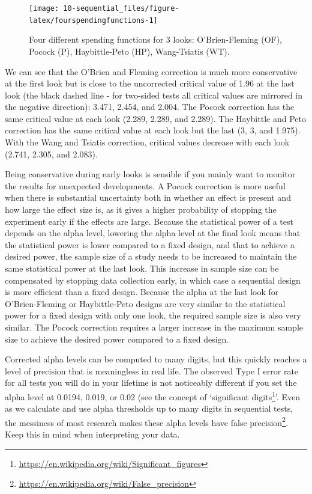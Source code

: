 \documentclass[
  oneside]{krantz}
\renewcommand{\href}[2]{#2\footnote{\url{#1}}}
\begin{document}
\begin{figure}

{\centering \texttt{[image: 10-sequential\_files/figure-latex/fourspendingfunctions-1]} 

}

\caption{Four different spending functions for 3 looks: O'Brien-Fleming (OF), Pocock (P), Haybittle-Peto (HP), Wang-Tsiatis (WT).}\label{fig:fourspendingfunctions}
\end{figure}

We can see that the O'Brien and Fleming correction is much more conservative at the first look but is close to the uncorrected critical value of 1.96 at the last look (the black dashed line - for two-sided tests all critical values are mirrored in the negative direction): 3.471, 2.454, and 2.004. The Pocock correction has the same critical value at each look (2.289, 2.289, and 2.289). The Haybittle and Peto correction has the same critical value at each look but the last (3, 3, and 1.975). With the Wang and Tsiatis correction, critical values decrease with each look (2.741, 2.305, and 2.083).

Being conservative during early looks is sensible if you mainly want to monitor the results for unexpected developments. A Pocock correction is more useful when there is substantial uncertainty both in whether an effect is present and how large the effect size is, as it gives a higher probability of stopping the experiment early if the effects are large. Because the statistical power of a test depends on the alpha level, lowering the alpha level at the final look means that the statistical power is lower compared to a fixed design, and that to achieve a desired power, the sample size of a study needs to be increased to maintain the same statistical power at the last look. This increase in sample size can be compensated by stopping data collection early, in which case a sequential design is more efficient than a fixed design. Because the alpha at the last look for O'Brien-Fleming or Haybittle-Peto designs are very similar to the statistical power for a fixed design with only one look, the required sample size is also very similar. The Pocock correction requires a larger increase in the maximum sample size to achieve the desired power compared to a fixed design.

Corrected alpha levels can be computed to many digits, but this quickly reaches a level of precision that is meaningless in real life. The observed Type I error rate for all tests you will do in your lifetime is not noticeably different if you set the alpha level at 0.0194, 0.019, or 0.02 (see the concept of `\href{https://en.wikipedia.org/wiki/Significant_figures}{significant digits}'. Even as we calculate and use alpha thresholds up to many digits in sequential tests, the messiness of most research makes these alpha levels have \href{https://en.wikipedia.org/wiki/False_precision}{false precision}. Keep this in mind when interpreting your data.
\end{document}
